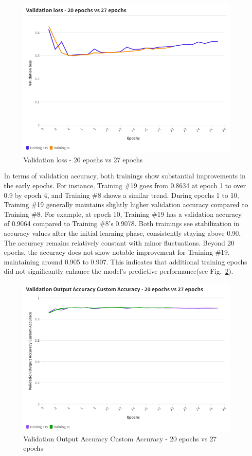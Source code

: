 \documentclass[runningheads]{llncs}
\begin{document}
\begin{figure}
\includegraphics[width=\textwidth]{val loss.png}
\caption{Validation loss - 20 epochs vs 27 epochs} \label{fig9}
\end{figure}


In terms of validation accuracy, both trainings show substantial improvements in the early epochs. For instance, Training \#19 goes from 0.8634 at epoch 1 to over 0.9 by epoch 4, and Training \#8 shows a similar trend. During epochs 1 to 10, Training \#19 generally maintains slightly higher validation accuracy compared to Training \#8. For example, at epoch 10, Training \#19 has a validation accuracy of 0.9064 compared to Training \#8's 0.9078. Both trainings see stabilization in accuracy values after the initial learning phase, consistently staying above 0.90. The accuracy remains relatively constant with minor fluctuations. Beyond 20 epochs, the accuracy does not show notable improvement for Training \#19, maintaining around 0.905 to 0.907. This indicates that additional training epochs did not significantly enhance the model's predictive performance(see Fig.~\ref{fig10}).

\begin{figure}
\includegraphics[width=\textwidth]{val acc.png}
\caption{Validation Output Accuracy Custom Accuracy - 20 epochs vs 27 epochs} \label{fig10}
\end{figure}
\end{document}

